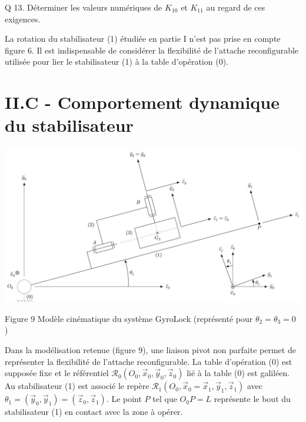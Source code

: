 \documentclass[10pt]{article}
\begin{document}
Q 13. Déterminer les valeurs numériques de $K_{10}$ et $K_{11}$ au regard de ces exigences.

La rotation du stabilisateur (1) étudiée en partie I n'est pas prise en compte figure 6. Il est indispensable de considérer la flexibilité de l'attache reconfigurable utilisée pour lier le stabilisateur (1) à la table d'opération (0).

\section{II.C - Comportement dynamique du stabilisateur}
\begin{center}
\includegraphics[max width=\textwidth]{2023_07_26_54f5e859400a10e656ddg-06}
\end{center}

Figure 9 Modèle cinématique du système GyroLock (représenté pour $\theta_{2}=\theta_{3}=0$ )

Dans la modélisation retenue (figure 9), une liaison pivot non parfaite permet de représenter la flexibilité de l'attache reconfigurable. La table d'opération (0) est supposée fixe et le référentiel $\mathcal{R}_{0}\left(O_{0}, \vec{x}_{0}, \vec{y}_{0}, \vec{z}_{0}\right)$ lié à la table (0) est galiléen. Au stabilisateur (1) est associé le repère $\mathcal{R}_{1}\left(O_{0}, \vec{x}_{0}=\vec{x}_{1}, \vec{y}_{1}, \vec{z}_{1}\right)$ avec $\theta_{1}=\left(\vec{y}_{0}, \vec{y}_{1}\right)=\left(\vec{z}_{0}, \vec{z}_{1}\right)$. Le point $P$ tel que $O_{0} P=L$ représente le bout du stabilisateur (1) en contact avec la zone à opérer.
\end{document}
